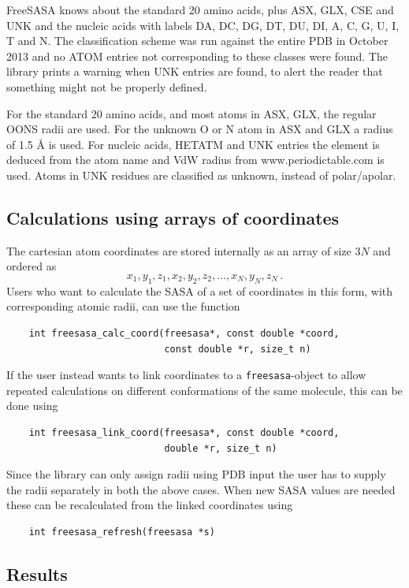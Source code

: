 \documentclass[a4paper,11pt]{article}
\begin{document}
FreeSASA knows about the standard 20 amino acids, plus ASX, GLX, CSE
and UNK and the nucleic acids with labels DA, DC, DG, DT, DU, DI, A,
C, G, U, I, T and N. The classification scheme was run against the
entire PDB in October 2013 and no ATOM entries not corresponding to
these classes were found. The library prints a warning when UNK
entries are found, to alert the reader that something might not be
properly defined.

For the standard 20 amino acids, and most atoms in ASX, GLX, the
regular OONS radii \cite{OONS} are used. For the unknown O or N atom
in ASX and GLX a radius of 1.5 Å is used. For nucleic acids, HETATM and UNK
entries the element is deduced from the atom name and VdW radius from
www.periodictable.com is used. Atoms in UNK residues are classified as
unknown, instead of polar/apolar.

\subsection{Calculations using arrays of coordinates}

The cartesian atom coordinates are stored internally as an array of
size $3N$ and ordered as $$x_1,y_1,z_1, x_2,y_2,z_2, \ldots
,x_N,y_N,z_N\,.$$ Users who want to calculate the SASA of a set of
coordinates in this form, with corresponding atomic radii, can use the
function
\begin{verbatim}
    int freesasa_calc_coord(freesasa*, const double *coord, 
                            const double *r, size_t n)
\end{verbatim}
If the user instead wants to link coordinates to a
\verb|freesasa|-object to allow repeated calculations on different
conformations of the same molecule, this can be done using
\begin{verbatim}
    int freesasa_link_coord(freesasa*, const double *coord,
                            double *r, size_t n)
\end{verbatim}

Since the library can only assign radii using PDB input the user has
to supply the radii separately in both the above cases. When new SASA
values are needed these can be recalculated from the linked
coordinates using
\begin{verbatim} 
    int freesasa_refresh(freesasa *s)
\end{verbatim}

\subsection{Results}
\end{document}
